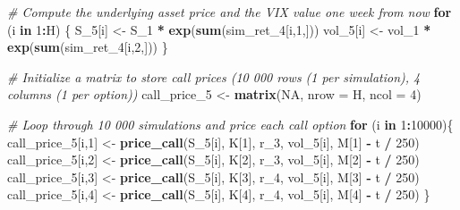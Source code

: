 \documentclass[]{article}
\newenvironment{Shaded}{\begin{snugshade}}{\end{snugshade}}
\newcommand{\CommentTok}[1]{\textcolor[rgb]{0.56,0.35,0.01}{\textit{#1}}}
\newcommand{\ControlFlowTok}[1]{\textcolor[rgb]{0.13,0.29,0.53}{\textbf{#1}}}
\newcommand{\DataTypeTok}[1]{\textcolor[rgb]{0.13,0.29,0.53}{#1}}
\newcommand{\DecValTok}[1]{\textcolor[rgb]{0.00,0.00,0.81}{#1}}
\newcommand{\KeywordTok}[1]{\textcolor[rgb]{0.13,0.29,0.53}{\textbf{#1}}}
\newcommand{\NormalTok}[1]{#1}
\newcommand{\OperatorTok}[1]{\textcolor[rgb]{0.81,0.36,0.00}{\textbf{#1}}}
\newcommand{\OtherTok}[1]{\textcolor[rgb]{0.56,0.35,0.01}{#1}}
\newcommand{\StringTok}[1]{\textcolor[rgb]{0.31,0.60,0.02}{#1}}
\begin{document}
\begin{Shaded}
\begin{Highlighting}[]
\CommentTok{# Compute the underlying asset price and the VIX value one week from now}
\ControlFlowTok{for}\NormalTok{ (i }\ControlFlowTok{in} \DecValTok{1}\OperatorTok{:}\NormalTok{H) \{}
\NormalTok{  S_}\DecValTok{5}\NormalTok{[i]   <-}\StringTok{ }\NormalTok{S_}\DecValTok{1} \OperatorTok{*}\StringTok{ }\KeywordTok{exp}\NormalTok{(}\KeywordTok{sum}\NormalTok{(sim_ret_}\DecValTok{4}\NormalTok{[i,}\DecValTok{1}\NormalTok{,]))}
\NormalTok{  vol_}\DecValTok{5}\NormalTok{[i] <-}\StringTok{ }\NormalTok{vol_}\DecValTok{1} \OperatorTok{*}\StringTok{ }\KeywordTok{exp}\NormalTok{(}\KeywordTok{sum}\NormalTok{(sim_ret_}\DecValTok{4}\NormalTok{[i,}\DecValTok{2}\NormalTok{,]))}
\NormalTok{\}}

\CommentTok{# Initialize a matrix to store call prices (10 000 rows (1 per simulation), 4 columns (1 per option))}
\NormalTok{call_price_}\DecValTok{5}\NormalTok{ <-}\StringTok{ }\KeywordTok{matrix}\NormalTok{(}\OtherTok{NA}\NormalTok{, }\DataTypeTok{nrow =}\NormalTok{ H, }\DataTypeTok{ncol =} \DecValTok{4}\NormalTok{)}

\CommentTok{# Loop through 10 000 simulations and price each call option}
\ControlFlowTok{for}\NormalTok{ (i }\ControlFlowTok{in} \DecValTok{1}\OperatorTok{:}\DecValTok{10000}\NormalTok{)\{}
\NormalTok{  call_price_}\DecValTok{5}\NormalTok{[i,}\DecValTok{1}\NormalTok{] <-}\StringTok{ }\KeywordTok{price_call}\NormalTok{(S_}\DecValTok{5}\NormalTok{[i], K[}\DecValTok{1}\NormalTok{], r_}\DecValTok{3}\NormalTok{, vol_}\DecValTok{5}\NormalTok{[i], M[}\DecValTok{1}\NormalTok{] }\OperatorTok{-}\StringTok{ }\NormalTok{t }\OperatorTok{/}\StringTok{ }\DecValTok{250}\NormalTok{)}
\NormalTok{  call_price_}\DecValTok{5}\NormalTok{[i,}\DecValTok{2}\NormalTok{] <-}\StringTok{ }\KeywordTok{price_call}\NormalTok{(S_}\DecValTok{5}\NormalTok{[i], K[}\DecValTok{2}\NormalTok{], r_}\DecValTok{3}\NormalTok{, vol_}\DecValTok{5}\NormalTok{[i], M[}\DecValTok{2}\NormalTok{] }\OperatorTok{-}\StringTok{ }\NormalTok{t }\OperatorTok{/}\StringTok{ }\DecValTok{250}\NormalTok{)}
\NormalTok{  call_price_}\DecValTok{5}\NormalTok{[i,}\DecValTok{3}\NormalTok{] <-}\StringTok{ }\KeywordTok{price_call}\NormalTok{(S_}\DecValTok{5}\NormalTok{[i], K[}\DecValTok{3}\NormalTok{], r_}\DecValTok{4}\NormalTok{, vol_}\DecValTok{5}\NormalTok{[i], M[}\DecValTok{3}\NormalTok{] }\OperatorTok{-}\StringTok{ }\NormalTok{t }\OperatorTok{/}\StringTok{ }\DecValTok{250}\NormalTok{)}
\NormalTok{  call_price_}\DecValTok{5}\NormalTok{[i,}\DecValTok{4}\NormalTok{] <-}\StringTok{ }\KeywordTok{price_call}\NormalTok{(S_}\DecValTok{5}\NormalTok{[i], K[}\DecValTok{4}\NormalTok{], r_}\DecValTok{4}\NormalTok{, vol_}\DecValTok{5}\NormalTok{[i], M[}\DecValTok{4}\NormalTok{] }\OperatorTok{-}\StringTok{ }\NormalTok{t }\OperatorTok{/}\StringTok{ }\DecValTok{250}\NormalTok{)}
\NormalTok{\}}


\end{Highlighting}
\end{Shaded}
\end{document}

